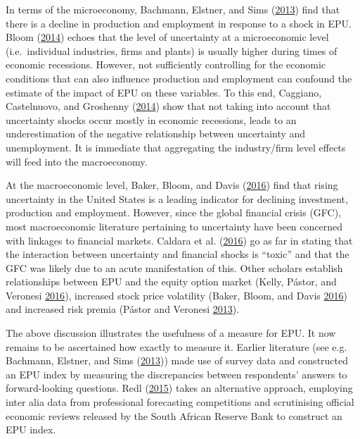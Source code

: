 \documentclass[11pt,preprint, authoryear]{elsarticle}
\numberwithin{equation}{section}
\numberwithin{figure}{section}
\numberwithin{table}{section}
\begin{document}
In terms of the microeconomy, Bachmann, Elstner, and Sims
(\protect\hyperlink{ref-Bachmann2013}{2013}) find that there is a
decline in production and employment in response to a shock in EPU.
Bloom (\protect\hyperlink{ref-Bloom2014}{2014}) echoes that the level of
uncertainty at a microeconomic level (i.e.~individual industries, firms
and plants) is usually higher during times of economic recessions.
However, not sufficiently controlling for the economic conditions that
can also influence production and employment can confound the estimate
of the impact of EPU on these variables. To this end, Caggiano,
Castelnuovo, and Groshenny (\protect\hyperlink{ref-Caggiano2014}{2014})
show that not taking into account that uncertainty shocks occur mostly
in economic recessions, leads to an underestimation of the negative
relationship between uncertainty and unemployment. It is immediate that
aggregating the industry/firm level effects will feed into the
macroeconomy.

At the macroeconomic level, Baker, Bloom, and Davis
(\protect\hyperlink{ref-Baker2016}{2016}) find that rising uncertainty
in the United States is a leading indicator for declining investment,
production and employment. However, since the global financial crisis
(GFC), most macroeconomic literature pertaining to uncertainty have been
concerned with linkages to financial markets. Caldara et al.
(\protect\hyperlink{ref-Caldara2016}{2016}) go as far in stating that
the interaction between uncertainty and financial shocks is ``toxic''
and that the GFC was likely due to an acute manifestation of this. Other
scholars establish relationships between EPU and the equity option
market (Kelly, Pástor, and Veronesi
\protect\hyperlink{ref-Kelly2016}{2016}), increased stock price
volatility (Baker, Bloom, and Davis
\protect\hyperlink{ref-Baker2016}{2016}) and increased risk premia
(Pástor and Veronesi \protect\hyperlink{ref-Pastor2013}{2013}).

The above discussion illustrates the usefulness of a measure for EPU. It
now remains to be ascertained how exactly to measure it. Earlier
literature (see e.g. Bachmann, Elstner, and Sims
(\protect\hyperlink{ref-Bachmann2013}{2013})) made use of survey data
and constructed an EPU index by measuring the discrepancies between
respondents' answers to forward-looking questions. Redl
(\protect\hyperlink{ref-Redl2015}{2015}) takes an alternative approach,
employing inter alia data from professional forecasting competitions and
scrutinising official economic reviews released by the South African
Reserve Bank to construct an EPU index.
\end{document}
